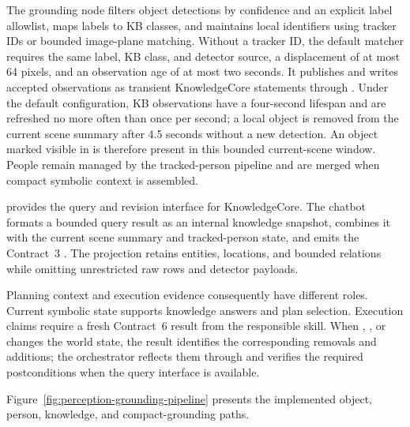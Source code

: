 The grounding node filters object detections by confidence and an explicit label allowlist, maps labels to KB classes, and maintains local identifiers using tracker IDs or bounded image-plane matching. Without a tracker ID, the default matcher requires the same label, KB class, and detector source, a displacement of at most 64 pixels, and an observation age of at most two seconds. It publishes  and writes accepted observations as transient KnowledgeCore statements through . Under the default configuration, KB observations have a four-second lifespan and are refreshed no more often than once per second; a local object is removed from the current scene summary after 4.5 seconds without a new detection. An object marked visible in  is therefore present in this bounded current-scene window. People remain managed by the tracked-person pipeline and are merged when compact symbolic context is assembled.

 provides the query and revision interface for KnowledgeCore. The chatbot formats a bounded query result as an internal knowledge snapshot, combines it with the current scene summary and tracked-person state, and emits the Contract~3 . The projection retains entities, locations, and bounded relations while omitting unrestricted raw rows and detector payloads.

Planning context and execution evidence consequently have different roles. Current symbolic state supports knowledge answers and plan selection. Execution claims require a fresh Contract~6 result from the responsible skill. When , , or  changes the world state, the result identifies the corresponding removals and additions; the orchestrator reflects them through  and verifies the required postconditions when the query interface is available.

Figure~\ref{fig:perception-grounding-pipeline} presents the implemented object, person, knowledge, and compact-grounding paths.

